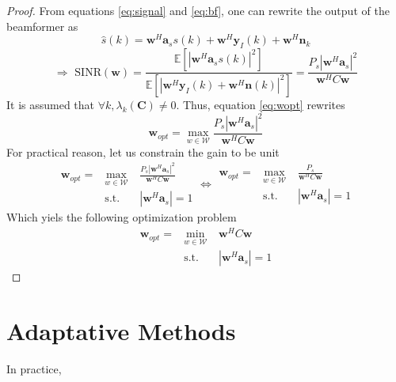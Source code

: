\documentclass[12pt]{article}
\begin{document}
\begin{proof}
From equations \ref{eq:signal} and \ref{eq:bf}, one can rewrite the output of the beamformer as
\begin{equation*}\label{eq:new_signal}
   \hat{s}(k) = \mathbf{w}^H\mathbf{a}_ss(k) + \mathbf{w}^H\mathbf{y}_{I}(k) + \mathbf{w}^H\mathbf{n}_k
\end{equation*}
\begin{equation*}
    \Rightarrow \text{ SINR}(\mathbf{w}) = \frac{\mathbb{E}\left[|\mathbf{w}^H\mathbf{a}_ss(k)|^2\right]}{\mathbb{E}\left[|\mathbf{w}^H\mathbf{y}_{I}(k) + \mathbf{w}^H\mathbf{n}(k)|^2\right]} = \frac{P_s|\mathbf{w}^H\mathbf{a}_s|^2}{\mathbf{w}^HC\mathbf{w}}
\end{equation*}
It is assumed that $\forall k, \lambda_k(\mathbf{C})\neq 0$. Thus, equation \ref{eq:wopt} rewrites
\begin{equation*}
    \mathbf{w}_{opt} = \max_{w\in\mathcal{W}} \frac{P_s|\mathbf{w}^H\mathbf{a}_s|^2}{\mathbf{w}^HC\mathbf{w}}
\end{equation*}
For practical reason, let us constrain the gain to be unit
$$\begin{aligned}
    \mathbf{w}_{opt} =& \max_{w\in\mathcal{W}} &\frac{P_s|\mathbf{w}^H\mathbf{a}_s|^2}{\mathbf{w}^HC\mathbf{w}}\\
    & \textrm{s.t.} \quad &|\mathbf{w}^H\mathbf{a}_s| = 1
\end{aligned} \Longleftrightarrow \begin{aligned}
    \mathbf{w}_{opt} =& \max_{w\in\mathcal{W}} &\frac{P_s}{\mathbf{w}^HC\mathbf{w}}\\
    & \textrm{s.t.} \quad &|\mathbf{w}^H\mathbf{a}_s| = 1
\end{aligned}$$
Which yiels the following optimization problem
$$\begin{aligned}
    \mathbf{w}_{opt} =& \min_{w\in\mathcal{W}} &\mathbf{w}^HC\mathbf{w}\\
    & \textrm{s.t.} \quad &|\mathbf{w}^H\mathbf{a}_s| = 1
\end{aligned}$$
\end{proof}
\section{Adaptative Methods}
In practice, 
\end{document}
